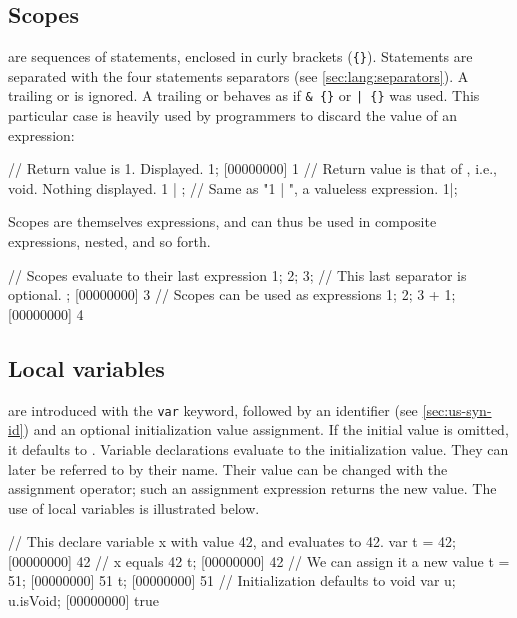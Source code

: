 \subsection{Scopes}

 are sequences of statements, enclosed in curly brackets
(\lstinline|{}|). Statements are separated with the four statements
separators (see \autoref{sec:lang:separators}).  A trailing \samp{;}
or \samp{,} is ignored.  A trailing \samp{\&} or \samp{|} behaves as
if \lstinline|& {}| or \lstinline'| {}' was used.  This particular
case is heavily used by \us programmers to discard the value of an
expression:

\begin{urbiscript}
// Return value is 1.  Displayed.
1;
[00000000] 1
// Return value is that of {}, i.e., void.  Nothing displayed.
1 | {};
// Same as "1 | {}", a valueless expression.
1|;
\end{urbiscript}

Scopes are themselves expressions, and can thus be used in composite
expressions, nested, and so forth.

\begin{urbiscript}
// Scopes evaluate to their last expression
{
  1;
  2;
  3; // This last separator is optional.
};
[00000000] 3
// Scopes can be used as expressions
{1; 2; 3} + 1;
[00000000] 4
\end{urbiscript}

\subsection{Local variables}

 are introduced with the \lstinline|var| keyword,
followed by an identifier (see \autoref{sec:us-syn-id}) and an optional
initialization value assignment. If the initial value is omitted, it
defaults to . Variable
declarations evaluate to
the initialization value. They can later be referred to by their
name. Their value can be changed with the assignment operator; such an
assignment expression returns the new value. The use of local
variables is illustrated below.

\begin{urbiscript}
// This declare variable x with value 42, and evaluates to 42.
var t = 42;
[00000000] 42
// x equals 42
t;
[00000000] 42
// We can assign it a new value
t = 51;
[00000000] 51
t;
[00000000] 51
// Initialization defaults to void
var u;
u.isVoid;
[00000000] true
\end{urbiscript}

